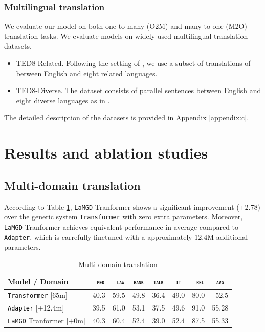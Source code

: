 \documentclass[11pt]{article}
\newcommand{\revision}[1]{\textcolor{black}{#1}}
\newcommand{\domain}[1]{\texttt{\textsc{#1}}}
\newcommand{\system}[1]{\texttt{{#1}}}
\begin{document}
\subsubsection{Multilingual translation}
We evaluate our model on both one-to-many (O2M) and many-to-one (M2O)
translation tasks. We evaluate models on widely used multilingual translation datasets.
\begin{itemize}
	\item TED8-Related. Following the setting of \citet{Wang20balancing}, we use a subset of translations of \citet{qi18when} between English and eight related languages.
	\item TED8-Diverse. The dataset consists of parallel sentences between English and eight diverse languages as in \citet{Wang20balancing}.
\end{itemize}
The detailed description of the datasets is provided in Appendix \ref{appendix:c}.
\section{Results and ablation studies}
\subsection{Multi-domain translation}
According to Table \ref{tab:mdmt}, \system{LaMGD} Tranformer shows a significant improvement (+2.78) over the generic system \system{Transformer} with zero extra parameters. Moreover, \system{LaMGD} Tranformer achieves equivalent performance in average compared to \system{Adapter}, which is carrefully finetuned with a approximately 12.4M additional parameters.
\begin{table}[h!]
  \centering
  \begin{tabular}{|p{4cm}|*{7}{r|}} \hline
    Model / Domain & \multicolumn{1}{c|}{\domain{ med}} & \multicolumn{1}{c|}{\domain{ law}} & \multicolumn{1}{c|}{\domain{bank}} & \multicolumn{1}{c|}{\domain{talk}} & \multicolumn{1}{c|}{\domain{ it }} & \multicolumn{1}{c|}{\domain{ rel}} & \multicolumn{1}{c|}{\domain{avg}} \\ \hline 
    \system{Transformer}  \hfill{\footnotesize[65m]} & 40.3 & 59.5 & 49.8 & 36.4 & 49.0 & 80.0  & 52.5\\
    \revision{\system{Adapter}}   \hfill{\footnotesize[+12.4m]}  & 39.5 & 61.0 & 53.1 & 37.5 & 49.6 & 91.0 & 55.28 \\ 
    \system{LaMGD} Tranformer   \hfill{\footnotesize[+0m]}  & 40.3 & 60.4 & 52.4 & 39.0 & 52.4 & 87.5 & 55.33 \\ 
    \hline
  \end{tabular}
  \caption{Multi-domain translation}
  \label{tab:mdmt}
\end{table}
\end{document}
